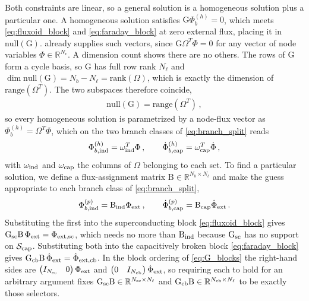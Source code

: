 \documentclass[10pt,aps,pra,onecolumn,superscriptaddress,floatfix,nofootinbib]{revtex4-2}
\begin{document}
Both constraints are linear, so a general solution is a homogeneous solution plus a particular one.
A homogeneous solution satisfies $\mathrm{G}\Phi_b^{(h)} = 0$, which meets \cref{eq:fluxoid_block} and \cref{eq:faraday_block} at zero external flux, placing it in $\mathrm{null}(\mathrm{G})$.
 already supplies such vectors, since $\mathrm{G}\Omega^T\Phi = 0$ for any vector of node variables $\Phi \in \mathbb{R}^{N_v}$.
A dimension count shows there are no others.
The rows of $\mathrm{G}$ form a cycle basis, so $\mathrm{G}$ has full row rank $N_\ell$ and $\dim\mathrm{null}(\mathrm{G}) = N_b - N_\ell = \mathrm{rank}(\Omega)$, which is exactly the dimension of $\mathrm{range}(\Omega^T)$.
The two subspaces therefore coincide,
\begin{align}
    \mathrm{null}(\mathrm{G}) = \mathrm{range}(\Omega^T) \, ,
    \label{eq:nullG_rangeOmegaT}
\end{align}
so every homogeneous solution is parametrized by a node-flux vector as $\Phi_b^{(h)} = \Omega^T\Phi$, which on the two branch classes of \cref{eq:branch_split} reads
\begin{align}\label{eq:homog_sol}
    \Phi_{b,\rm ind}^{(h)} = \omega_{\rm ind}^T \Phi \, , \qquad
    \dot\Phi_{b,\rm cap}^{(h)} = \omega_{\rm cap}^T \dot\Phi \, ,
\end{align}
with $\omega_{\rm ind}$ and $\omega_{\rm cap}$ the columns of $\Omega$ belonging to each set.
To find a particular solution, we define a flux-assignment matrix $\mathrm{B} \in \mathbb{R}^{N_b\times N_\ell}$ and make the guess appropriate to each branch class of \cref{eq:branch_split},
\begin{align}
    \Phi_{b,\rm ind}^{(p)} = \mathrm{B}_{\rm ind}\Phi_{\rm ext} \, , \qquad
    \dot\Phi_{b,\rm cap}^{(p)} = \mathrm{B}_{\rm cap}\dot\Phi_{\rm ext} \, .
    \label{eq:particular_split}
\end{align}
Substituting the first into the superconducting block \cref{eq:fluxoid_block} gives $\mathrm{G}_{\rm sc}\mathrm{B}\,\Phi_{\rm ext} = \Phi_{\rm ext, sc}$, which needs no more than $\mathrm{B}_{\rm ind}$ because $\mathrm{G}_{\rm sc}$ has no support on $\mathcal{S}_{\rm cap}$.
Substituting both into the capacitively broken block \cref{eq:faraday_block} gives $\mathrm{G}_{\rm cb}\mathrm{B}\,\dot\Phi_{\rm ext} = \dot\Phi_{\rm ext, cb}$.
In the block ordering of \cref{eq:G_blocks} the right-hand sides are $\begin{pmatrix} I_{N_{\rm sc}} & 0\end{pmatrix}\Phi_{\rm ext}$ and $\begin{pmatrix} 0 & I_{N_{\rm cb}}\end{pmatrix}\dot\Phi_{\rm ext}$, so requiring each to hold for an arbitrary argument fixes $\mathrm{G}_{\rm sc}\mathrm{B} \in \mathbb{R}^{N_{\rm sc}\times N_\ell}$ and $\mathrm{G}_{\rm cb}\mathrm{B} \in \mathbb{R}^{N_{\rm cb}\times N_\ell}$ to be exactly those selectors.
\end{document}
